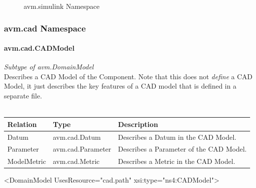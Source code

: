 \begin{figure}[h!]
\caption{avm.simulink Namespace}
\end{figure}


\subsubsection{avm.cad Namespace}

\paragraph{avm.cad.CADModel}
\textit{Subtype of avm.DomainModel}\\
Describes a CAD Model of the Component. Note that this does not \textit{define} a CAD Model, it just describes the key features of a CAD model that is defined in a separate file.
\\ \\
\begin{tabular}{ l l p{9cm} }
\textbf{Relation} & \textbf{Type} & \textbf{Description} \\ \hline
Datum & avm.cad.Datum & Describes a Datum in the CAD Model. \\ \hline
Parameter & avm.cad.Parameter & Describes a Parameter of the CAD Model. \\ \hline
ModelMetric & avm.cad.Metric & Describes a Metric in the CAD Model. \\ \hline
\end{tabular}

\begin{MyVerbatim}
 <DomainModel UsesResource="cad.path" xsi:type="ns4:CADModel">
\end{MyVerbatim}

